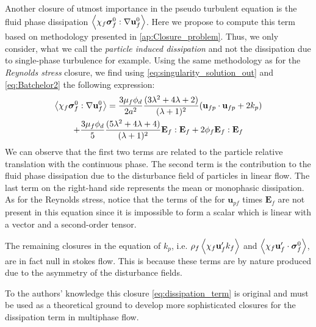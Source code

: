 Another closure of utmost importance in the pseudo turbulent equation is the fluid phase dissipation $\left<\chi_f \bm\sigma_f^0 :\mathbf{\nabla}\textbf{u}_f^0\right>$. 
Here we propose to compute this term based on  methodology presented in \ref{ap:Closure_problem}. 
Thus, we only consider, what we call the \textit{particle induced dissipation} and not the dissipation due to single-phase turbulence for example.
Using the same methodology as for the \textit{Reynolds stress} closure, we find using \ref{eq:singularity_solution_out} and \ref{eq:Batchelor2} the following expression: 
\begin{multline}
    \avg{\chi_f \bm\sigma_f^0 :\grad\textbf{u}_f^0}
    =
    \frac{3\mu_f \phi_d}{2a^2}
    \frac{(3\lambda^2 + 4\lambda +2)}{(\lambda + 1)^2}
    (\textbf{u}_{fp}\cdot \textbf{u}_{fp} + 2 k_p ) \\
    + 
    \frac{3\mu_f \phi_d}{5}
    \frac{(5\lambda^2 + 4\lambda +4)}{(\lambda + 1)^2}
    \textbf{E}_f:\textbf{E}_f
    +2 \phi_f \textbf{E}_f:\textbf{E}_f
    \label{eq:dissipation_term}
\end{multline}
We can observe that the first two terms are related to the particle relative translation with the continuous phase. 
The second term is the contribution to the fluid phase dissipation due to the  disturbance field of particles in linear flow. 
The last term on the right-hand side represents the mean or monophasic dissipation. 
As for the Reynolds stress, notice that the terms of the for $\textbf{u}_{pf}$ times $\textbf{E}_f$ are not present in this equation since it is impossible to form a scalar which is linear with a vector and a second-order tensor. 



The remaining closures in the equation of $k_p$, i.e. $\rho_f \left<\chi_f \textbf{u}_f' k_f\right>$ and $\left<\chi_f \textbf{u}_f' \cdot \bm{\sigma}_f^0\right>$, are in fact null in stokes flow. 
This is because these terms are by nature produced due to the asymmetry of the disturbance fields. 

To the authors' knowledge this closure \eqref{eq:dissipation_term} is original and must be used as a theoretical ground to develop more sophisticated closures for the dissipation term in multiphase flow.

